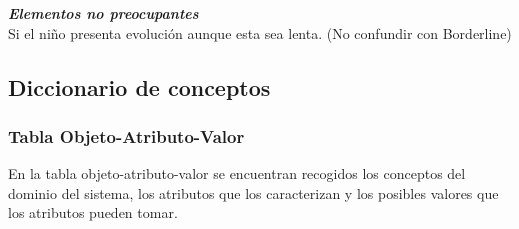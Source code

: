 \documentclass[letterpaper,12pt]{article}
\begin{document}
\begin{flushleft}
\textbf{\textit{Elementos no preocupantes}} \\
Si el niño presenta evolución aunque esta sea lenta. (No confundir con
Borderline) \\
\end{flushleft}

\subsection{Diccionario de conceptos}
\subsubsection{Tabla Objeto-Atributo-Valor}
En la tabla objeto-atributo-valor se encuentran recogidos los conceptos
del dominio del sistema, los atributos que los caracterizan y los posibles valores que los atributos pueden tomar.
\end{document}
